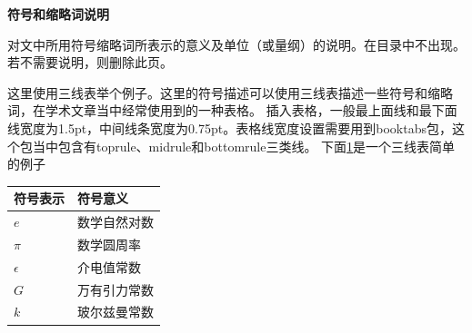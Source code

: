 \thispagestyle{empty}

\begin{center}
    \heiti\sanhao\bfseries{符号和缩略词说明}
    \vspace{1cm}
\end{center}

对文中所用符号缩略词所表示的意义及单位（或量纲）的说明。在目录中不出现。若不需要说明，则删除此页。

这里使用三线表举个例子。这里的符号描述可以使用三线表描述一些符号和缩略词，在学术文章当中经常使用到的一种表格。
插入表格，一般最上面线和最下面线宽度为1.5pt，中间线条宽度为0.75pt。表格线宽度设置需要用到booktabs包，这个包当中包含有toprule、midrule和bottomrule三类线。
下面\cref{tab:latex-sys-def}是一个三线表简单的例子
\begin{table}[hbpt]
    \centering
    \linespread{1.2}
    \begin{tabular}{p{}<{\centering}p{}<{\centering}}
        \toprule[1.5pt]
        符号表示       & 符号意义   \\
        \midrule[0.75pt]
        $e$        & 数学自然对数 \\
        $\pi$      & 数学圆周率  \\
        $\epsilon$ & 介电值常数  \\
        $G$        & 万有引力常数 \\
        $k$        & 玻尔兹曼常数 \\
        \bottomrule[1.5pt]
    \end{tabular}
    \label{tab:latex-sys-def}
\end{table}
\newpage
%
